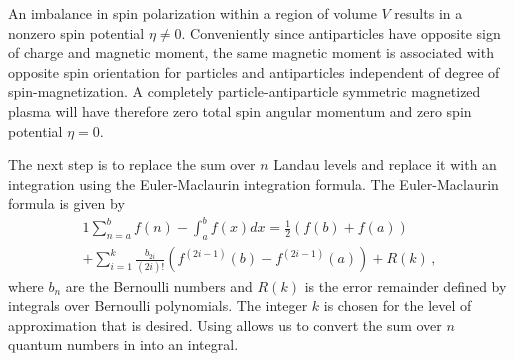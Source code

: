 An imbalance in spin polarization within a region of volume $V$ results in a nonzero spin potential $\eta\neq0$. Conveniently since antiparticles have opposite sign of charge and magnetic moment, the same magnetic moment is associated with opposite spin orientation for particles and antiparticles independent of degree of spin-magnetization. A completely particle-antiparticle symmetric magnetized plasma will have therefore zero total spin angular momentum and zero spin potential $\eta=0$.

The next step is to replace the sum over $n$ Landau levels and replace it with an integration using the Euler-Maclaurin integration formula. The Euler-Maclaurin formula is given by
\begin{multline}{1}
    \label{EulerM} \sum^{b}_{n=a}f(n)-\int^{b}_{a}f(x)dx = \frac{1}{2}\left(f(b)+f(a)\right)\\
    +\sum_{i=1}^{k}\frac{b_{2i}}{(2i)!}\left(f^{(2i-1)}(b)-f^{(2i-1)}(a)\right)+R(k)\,,
\end{multline}
where $b_{n}$ are the Bernoulli numbers and $R(k)$ is the error remainder defined by integrals over Bernoulli polynomials. The integer $k$ is chosen for the level of approximation that is desired. Using  allows us to convert the sum over $n$ quantum numbers in  into an integral.


